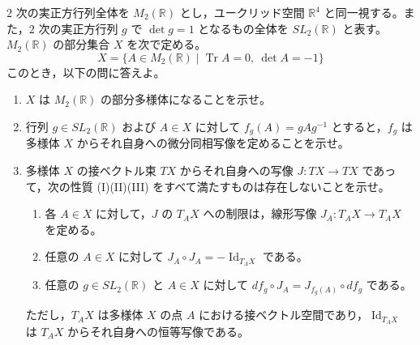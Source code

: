 \documentclass[12pt]{jlreq}
\newcommand{\Tr}{\operatorname{Tr}}
\begin{document}
$2$ 次の実正方行列全体を $M_2(\mathbb{R})$ とし，ユークリッド空間 $\mathbb{R}^4$ と同一視する。また，$2$ 次の実正方行列 $g$ で $\det g = 1$ となるもの全体を $SL_2(\mathbb{R})$ と表す。
$M_2(\mathbb{R})$ の部分集合 $X$ を次で定める。
\[
  X = \{ A \in M_2(\mathbb{R}) \mid \Tr A = 0,\ \det A = -1 \}
\]
このとき，以下の問に答えよ。

\begin{enumerate}
  \item $X$ は $M_2(\mathbb{R})$ の部分多様体になることを示せ。
  \item 行列 $g \in SL_2(\mathbb{R})$ および $A \in X$ に対して $f_g(A) = gAg^{-1}$ とすると，$f_g$ は多様体 $X$ からそれ自身への微分同相写像を定めることを示せ。
  \item 多様体 $X$ の接ベクトル束 $TX$ からそれ自身への写像 $J : TX \to TX$ であって，次の性質 (I)(II)(III) をすべて満たすものは存在しないことを示せ。
  \begin{enumerate}
    \item[(I)] 各 $A \in X$ に対して，$J$ の $T_A X$ への制限は，線形写像 $J_A : T_A X \to T_A X$ を定める。
    \item[(II)] 任意の $A \in X$ に対して $J_A \circ J_A = -\operatorname{Id}_{T_A X}$ である。
    \item[(III)] 任意の $g \in SL_2(\mathbb{R})$ と $A \in X$ に対して $df_g \circ J_A = J_{f_g(A)} \circ df_g$ である。
  \end{enumerate}
  ただし，$T_A X$ は多様体 $X$ の点 $A$ における接ベクトル空間であり，$\operatorname{Id}_{T_A X}$ は $T_A X$ からそれ自身への恒等写像である。
\end{enumerate}
\end{document}
